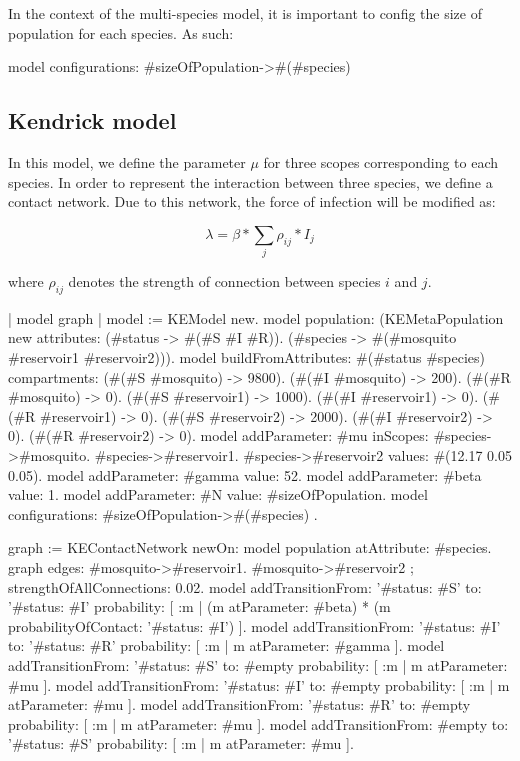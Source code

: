 \documentclass[a4paper,10pt,twoside]{book}
\begin{document}
In the context of the multi-species model, it is important to config the size of population for each species.
As such:


\begin{code}{}
model configurations: {#sizeOfPopulation->#(#species)}
\end{code}

\subsection{ Kendrick model}
In this model, we define the parameter  $\mu$ for three scopes corresponding to each species.
In order to represent the interaction between three species, we define a contact network.
Due to this network, the force of infection will be modified as:

  \begin{equation}
    \lambda = \beta * \sum_j \rho_{ij} * I_j
  \end{equation}
  
where  $\rho_{ij}$ denotes the strength of connection between species  $i$ and  $j$.


\begin{code}{}
| model graph |
	model := KEModel new.
	model
		population:
			(KEMetaPopulation new
				attributes:
					{(#status -> #(#S #I #R)).
					(#species -> #(#mosquito #reservoir1 #reservoir2))}).
	model
		buildFromAttributes: #(#status #species)
		compartments:
			{(#(#S #mosquito) -> 9800).
			(#(#I #mosquito) -> 200).
			(#(#R #mosquito) -> 0).
			(#(#S #reservoir1) -> 1000).
			(#(#I #reservoir1) -> 0).
			(#(#R #reservoir1) -> 0).
			(#(#S #reservoir2) -> 2000).
			(#(#I #reservoir2) -> 0).
			(#(#R #reservoir2) -> 0)}.
	model addParameter: #mu
		   inScopes: {
				#species->#mosquito.
				#species->#reservoir1.
				#species->#reservoir2}
		   values: #(12.17 0.05 0.05).
	model addParameter: #gamma value: 52.
	model addParameter: #beta value: 1.
	model addParameter: #N value: #sizeOfPopulation.
	model configurations: { #sizeOfPopulation->#(#species) }.

	graph := KEContactNetwork
			newOn: model population
			atAttribute: #species.
	graph edges: { #mosquito->#reservoir1. #mosquito->#reservoir2 };
			strengthOfAllConnections: 0.02.
	model
		addTransitionFrom: '{#status: #S}'
		to: '{#status: #I}'
		probability: [ :m | (m atParameter: #beta) * (m probabilityOfContact: '{#status: #I}') ].
	model
		addTransitionFrom: '{#status: #I}'
		to: '{#status: #R}'
		probability: [ :m | m atParameter: #gamma ].
	model
		addTransitionFrom: '{#status: #S}'
		to: #empty
		probability: [ :m | m atParameter: #mu ].
	model
		addTransitionFrom: '{#status: #I}'
		to: #empty
		probability: [ :m | m atParameter: #mu ].
	model
		addTransitionFrom: '{#status: #R}'
		to: #empty
		probability: [ :m | m atParameter: #mu ].
	model
		addTransitionFrom: #empty
		to: '{#status: #S}'
		probability: [ :m | m atParameter: #mu ].
\end{code}
\end{document}
